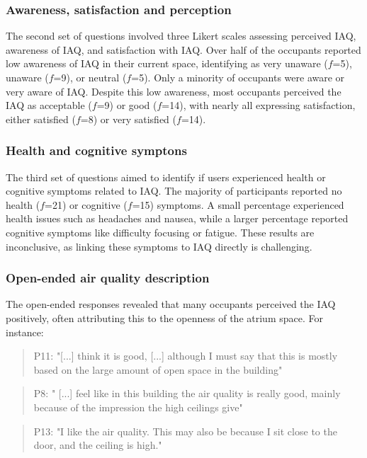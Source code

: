 \subsubsection{Awareness, satisfaction and perception}

The second set of questions involved three Likert scales assessing perceived IAQ, awareness of IAQ, and satisfaction with IAQ. Over half of the occupants reported low awareness of IAQ in their current space, identifying as very unaware ($f$=5), unaware ($f$=9), or neutral ($f$=5). Only a minority of occupants were aware or very aware of IAQ. Despite this low awareness, most occupants perceived the IAQ as acceptable ($f$=9) or good ($f$=14), with nearly all expressing satisfaction, either satisfied ($f$=8) or very satisfied ($f$=14).


\subsubsection{Health and cognitive symptons}

The third set of questions aimed to identify if users experienced health or cognitive symptoms related to IAQ. The majority of participants reported no health ($f$=21) or cognitive ($f$=15) symptoms. A small percentage experienced health issues such as headaches and nausea, while a larger percentage reported cognitive symptoms like difficulty focusing or fatigue. These results are inconclusive, as linking these symptoms to IAQ directly is challenging.

\subsubsection{Open-ended air quality description}
The open-ended responses revealed that many occupants perceived the IAQ positively, often attributing this to the openness of the atrium space. For instance:

\begin{quote}
P11: "[...] think it is good, [...] although I must say that this is mostly based on the large amount of open space in the building"
\end{quote}

\begin{quote}
P8: " [...] feel like in this building the air quality is really good, mainly because of the impression the high ceilings give"
\end{quote}

\begin{quote}
P13: "I like the air quality. This may also be because I sit close to the door, and the ceiling is high."
\end{quote}

